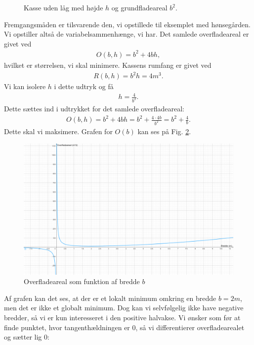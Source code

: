 \begin{exa}
\begin{figure}[H]
\caption{Kasse uden låg med højde $h$ og grundfladeareal $b^2$.}
\label{fig:kasse}
\end{figure}
Fremgangsmåden er tilsvarende den, vi opstillede til eksemplet med hønsegården. Vi opstiller altså de variabelsammenhænge, vi har. Det samlede overfladeareal er givet ved
\begin{align*}
O(b,h) = b^2+4bh,
\end{align*}
hvilket er størrelsen, vi skal minimere. Kassens rumfang er givet ved
\begin{align*}
R(b,h) = b^2h = 4m^3.
\end{align*}
Vi kan isolere $h$ i dette udtryk og få
\begin{align*}
h = \frac{4}{b^2}.
\end{align*}
Dette sættes ind i udtrykket for det samlede overfladeareal:
\begin{align*}
O(b,h) = b^2+ 4bh = b^2 + \frac{4\cdot4b}{b^2} = b^2+\frac{4}{b}.
\end{align*}
Dette skal vi maksimere. Grafen for $O(b)$ kan ses på Fig. \ref{fig:kassegraf}.
\begin{figure}[H]
\includegraphics[width = \textwidth]{Billeder/kassegraf.png}
\caption{Overfladeareal som funktion af bredde $b$}
\label{fig:kassegraf}
\end{figure}
Af grafen kan det ses, at der er et lokalt minimum omkring en bredde $b=2m$, men det er ikke et globalt minimum. Dog kan vi selvfølgelig ikke have negative bredder, så vi er kun interesseret i den positive halvakse. Vi ønsker som før at finde punktet, hvor tangenthældningen er $0$, så vi differentierer overfladearealet og sætter lig $0$:

\end{exa}
